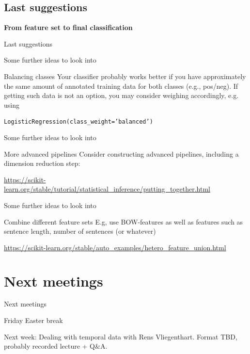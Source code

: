 \documentclass{beamer}
\begin{document}
\subsection{Last suggestions}

\begin{frame}[plain]
\textbf{From feature set to final classification}

Last suggestions
\end{frame}


\begin{frame}{Some further ideas to look into}

\begin{block}{Balancing classes}
Your classifier probably works better if you have approximately the same amount of annotated training data for both classes (e.g., pos/neg). If getting such data is not an option, you may consider weighing accordingly, e.g. using

\texttt{LogisticRegression(class\_weight='balanced')}
\end{block}

\end{frame}

\begin{frame}{Some further ideas to look into}

\begin{block}{More advanced pipelines}
	Consider constructing advanced pipelines, including a dimension reduction step: 
	
	
	\url{https://scikit-learn.org/stable/tutorial/statistical\_inference/putting\_together.html}
\end{block}

\end{frame}



\begin{frame}{Some further ideas to look into}

\begin{block}{Combine different feature sets}
	E.g, use BOW-features as well as features such as sentence length, number of sentences (or whatever)
	
	
	\url{
		https://scikit-learn.org/stable/auto\_examples/hetero\_feature\_union.html}
\end{block}




\end{frame}




\section{Next meetings}




\begin{frame}{Next meetings}
\begin{block}{Friday}
Easter break
\end{block}

\begin{block}{Next week: Dealing with temporal data}
with Rens Vliegenthart. Format TBD, probably recorded lecture + Q\&A.
\end{block}


\end{frame}
\end{document}
